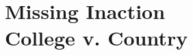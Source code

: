 

\def\thetitle{Missing Inaction\\College v. Country}
\def\shorttitle{Missing Inaction}
\def\theauthors{\textit{Parting Thots} by Geoffrey Challen}
\def\shortauthors{Challen}


\pagestyle{document}
\thispagestyle{emptydocument}
\chapter{\thetitle}


